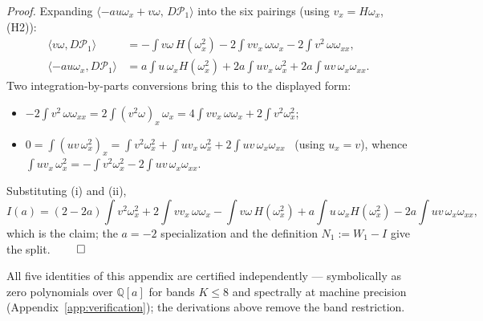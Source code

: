 \documentclass[11pt]{article}
\theoremstyle{remark}
\theoremstyle{plain}
\newcommand{\eqdef}{:=}
\begin{document}
\emph{Proof.} Expanding $\langle -a u\omega_x + v\omega,\, D\mathcal{P}_1\rangle$ into the six
pairings (using $v_x = H\omega_x$, (H2)):
\begin{equation}
\begin{aligned}
  \langle v\omega, D\mathcal{P}_1\rangle
  &= -\int v\omega\,H(\omega_x^2) - 2\int v v_x\,\omega\omega_x - 2\int v^2\,\omega\omega_{xx},\\
  \langle -a u\omega_x, D\mathcal{P}_1\rangle
  &= a\int u\,\omega_x H(\omega_x^2) + 2a\int u v_x\,\omega_x^2 + 2a\int uv\,\omega_x\omega_{xx} .
\end{aligned}
\end{equation}
Two integration-by-parts conversions bring this to the displayed form:
\begin{itemize}
\item[(i)] $\displaystyle -2\int v^2\,\omega\omega_{xx} = 2\int (v^2\omega)_x\,\omega_x
  = 4\int v v_x\,\omega\omega_x + 2\int v^2\omega_x^2$;
\item[(ii)] $\displaystyle 0 = \int (u v\,\omega_x^2)_x
  = \int v^2\omega_x^2 + \int u v_x\,\omega_x^2 + 2\int uv\,\omega_x\omega_{xx}$
  \ (using $u_x = v$), whence
  $\int u v_x\,\omega_x^2 = -\int v^2\omega_x^2 - 2\int uv\,\omega_x\omega_{xx}$.
\end{itemize}
Substituting (i) and (ii),
\begin{equation}
  I(a) = (2-2a)\int v^2\omega_x^2 + 2\int v v_x\,\omega\omega_x - \int v\omega\,H(\omega_x^2)
  + a\int u\,\omega_x H(\omega_x^2) - 2a\int uv\,\omega_x\omega_{xx},
\end{equation}
which is the claim; the $a=-2$ specialization and the definition $N_1 \eqdef W_1 - I$
give the split. $\qed$

All five identities of this appendix are certified independently --- symbolically as
zero polynomials over $\mathbb{Q}[a]$ for bands $K \le 8$ and spectrally at machine
precision (Appendix~\ref{app:verification}); the derivations above remove the band restriction.
\end{document}
